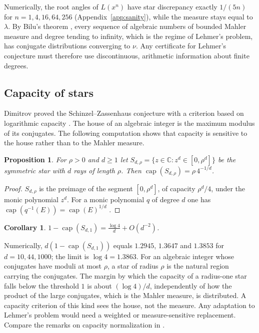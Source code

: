 \documentclass[11pt]{amsart}
\newtheorem{proposition}[theorem]{Proposition}
\newtheorem{corollary}[theorem]{Corollary}
\theoremstyle{definition}
\theoremstyle{remark}
\DeclareMathOperator{\capa}{cap}
\newcommand{\C}{\mathbb C}
\begin{document}
Numerically, the root angles of $L(x^n)$ have star discrepancy exactly $1/(5n)$ for $n=1,4,16,64,256$ (Appendix~\ref{app:sanity}), while the measure stays equal to $\lambda$. By Bilu's theorem \cite{Bilu}, every sequence of algebraic numbers of bounded Mahler measure and degree tending to infinity, which is the regime of Lehmer's problem, has conjugate distributions converging to $\nu$. Any certificate for Lehmer's conjecture must therefore use discontinuous, arithmetic information about finite degrees.

\subsection{Capacity of stars}
Dimitrov proved the Schinzel--Zassenhaus conjecture with a criterion based on logarithmic capacity \cite{Dimitrov}. The house of an algebraic integer is the maximum modulus of its conjugates. The following computation shows that capacity is sensitive to the house rather than to the Mahler measure.

\begin{proposition}\label{prop:star}
For $\rho>0$ and $d\ge1$ let $S_{d,\rho}=\{z\in\C:z^d\in[0,\rho^d]\}$ be the symmetric star with $d$ rays of length $\rho$. Then $\capa(S_{d,\rho})=\rho\,4^{-1/d}$.
\end{proposition}
\begin{proof}
$S_{d,\rho}$ is the preimage of the segment $[0,\rho^d]$, of capacity $\rho^d/4$, under the monic polynomial $z^d$. For a monic polynomial $q$ of degree $d$ one has $\capa(q^{-1}(E))=\capa(E)^{1/d}$ \cite[Sec.~5.2]{Ransford}.
\end{proof}

\begin{corollary}\label{cor:star}
$1-\capa(S_{d,1})=\frac{\log4}{d}+O(d^{-2})$.
\end{corollary}

Numerically, $d(1-\capa(S_{d,1}))$ equals $1.2945$, $1.3647$ and $1.3853$ for $d=10,44,1000$; the limit is $\log4=1.3863$. For an algebraic integer whose conjugates have moduli at most $\rho$, a star of radius $\rho$ is the natural region carrying the conjugates. The margin by which the capacity of a radius-one star falls below the threshold $1$ is about $(\log 4)/d$, independently of how the product of the large conjugates, which is the Mahler measure, is distributed. A capacity criterion of this kind sees the house, not the measure. Any adaptation to Lehmer's problem would need a weighted or measure-sensitive replacement. Compare the remarks on capacity normalization in \cite[manuscript 001]{VMRC}.
\end{document}
